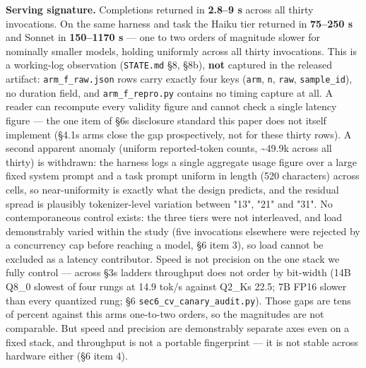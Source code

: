 \textbf{Serving signature.} Completions returned in \textbf{2.8--9 s} across all thirty invocations. On the same harness and task the Haiku tier returned in \textbf{75--250 s} and Sonnet in \textbf{150--1170 s} --- one to two orders of magnitude slower for nominally smaller models, holding uniformly across all thirty invocations. This is a working-log observation (\texttt{STATE.md} §8, §8b), \textbf{not} captured in the released artifact: \texttt{arm\_f\_raw.json} rows carry exactly four keys (\texttt{arm}, \texttt{n}, \texttt{raw}, \texttt{sample\_id}), no duration field, and \texttt{arm\_f\_repro.py} contains no timing capture at all. A reader can recompute every validity figure and cannot check a single latency figure --- the one item of §6\textquotesingle s disclosure standard this paper does not itself implement (§4.1\textquotesingle s arms close the gap prospectively, not for these thirty rows). A second apparent anomaly (uniform reported-token counts, \textasciitilde49.9k across all thirty) is withdrawn: the harness logs a single aggregate usage figure over a large fixed system prompt and a task prompt uniform in length (520 characters) across cells, so near-uniformity is exactly what the design predicts, and the residual spread is plausibly tokenizer-level variation between "13", "21" and "31". No contemporaneous control exists: the three tiers were not interleaved, and load demonstrably varied within the study (five invocations elsewhere were rejected by a concurrency cap before reaching a model, §6 item 3), so load cannot be excluded as a latency contributor. Speed is not precision on the one stack we fully control --- across §3\textquotesingle s ladders throughput does not order by bit-width (14B Q8\_0 slowest of four rungs at 14.9 tok/s against Q2\_K\textquotesingle s 22.5; 7B FP16 slower than every quantized rung; §6 \texttt{sec6\_cv\_canary\_audit.py}). Those gaps are tens of percent against this arm\textquotesingle s one-to-two orders, so the magnitudes are not comparable. But speed and precision are demonstrably separate axes even on a fixed stack, and throughput is not a portable fingerprint --- it is not stable across hardware either (§6 item 4).

